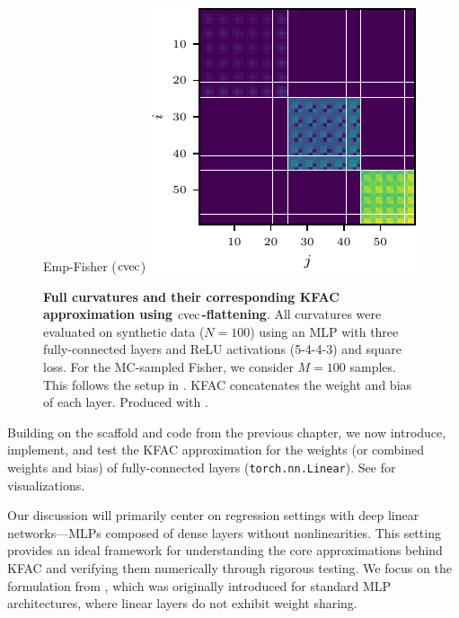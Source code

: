\begin{figure}[!h]
\begin{minipage}[t]{0.485\linewidth}
  \end{minipage}
  \hfill
  \begin{minipage}[t]{0.485\linewidth}
    \centering
    Emp-Fisher ($\operatorname{cvec}$)\vspace{1ex}
    \includegraphics[width=1.0\linewidth]{../kfs/plots/synthetic_cvec_empfisher_kfac.pdf}
  \end{minipage}
  \caption{\textbf{Full curvatures and their corresponding KFAC approximation using $\operatorname{cvec}$-flattening}.
    All curvatures were evaluated on synthetic data ($N = 100$) using an MLP with three fully-connected layers and ReLU activations (5-4-4-3) and square loss.
    For the MC-sampled Fisher, we consider $M = 100$ samples.
    This follows the setup in .
    KFAC concatenates the weight and bias of each layer.
    Produced with .}
  \label{fig:cvec-kfac-full-comparison}
\end{figure}
\switchcolumn[0]

Building on the scaffold and code from the previous chapter, we now introduce, implement, and test the KFAC approximation for the weights (or combined weights and bias) of fully-connected layers (\texttt{torch.nn.Linear}).
See  for visualizations.

Our discussion will primarily center on regression settings with deep linear networks---MLPs composed of dense layers without nonlinearities.
This setting provides an ideal framework for understanding the core approximations behind KFAC and verifying them numerically through rigorous testing.
We focus on the formulation from \citet{martens2015optimizing}, which was originally introduced for standard MLP architectures, where linear layers do not exhibit weight sharing.

